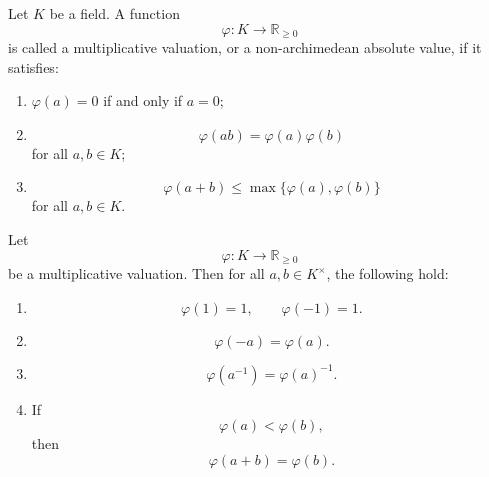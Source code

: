 \begin{definition}
    Let \(K\) be a field. A function
    \[
        \varphi:K\longrightarrow \mathbb{R}_{\geq 0}
    \]
    is called a multiplicative valuation, or a non-archimedean absolute value, if
    it satisfies:
    \begin{enumerate}
        \item \(\varphi(a)=0\) if and only if \(a=0\);
        \item
              \[
                  \varphi(ab)=\varphi(a)\varphi(b)
              \]
              for all \(a,b\in K\);
        \item
              \[
                  \varphi(a+b)\leq \max\{\varphi(a),\varphi(b)\}
              \]
              for all \(a,b\in K\).
    \end{enumerate}
\end{definition}

\begin{proposition}
    Let
    \[
        \varphi:K\longrightarrow \mathbb{R}_{\geq 0}
    \]
    be a multiplicative valuation. Then for all \(a,b\in K^\times\), the following
    hold:
    \begin{enumerate}
        \item
              \[
                  \varphi(1)=1,
                  \qquad
                  \varphi(-1)=1.
              \]
        \item
              \[
                  \varphi(-a)=\varphi(a).
              \]
        \item
              \[
                  \varphi(a^{-1})=\varphi(a)^{-1}.
              \]
        \item If
              \[
                  \varphi(a)<\varphi(b),
              \]
              then
              \[
                  \varphi(a+b)=\varphi(b).
              \]
    \end{enumerate}
\end{proposition}

